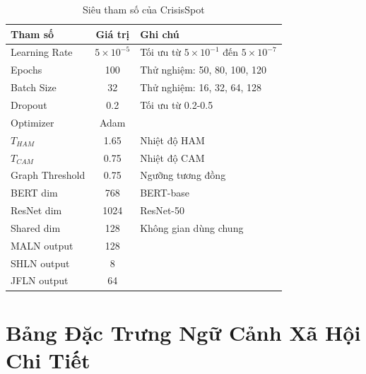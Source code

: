 \documentclass[12pt,a4paper]{article}
\begin{document}
\begin{table}[H]
\centering
\caption{Siêu tham số của CrisisSpot}
\label{tab:hyperparams}
\begin{tabular}{l|c|l}
\toprule
\textbf{Tham số} & \textbf{Giá trị} & \textbf{Ghi chú} \\
\midrule
Learning Rate & $5 \times 10^{-5}$ & Tối ưu từ $5 \times 10^{-1}$ đến $5 \times 10^{-7}$ \\
Epochs & 100 & Thử nghiệm: 50, 80, 100, 120 \\
Batch Size & 32 & Thử nghiệm: 16, 32, 64, 128 \\
Dropout & 0.2 & Tối ưu từ 0.2-0.5 \\
Optimizer & Adam & \\
$T_{HAM}$ & 1.65 & Nhiệt độ HAM \\
$T_{CAM}$ & 0.75 & Nhiệt độ CAM \\
Graph Threshold & 0.75 & Ngưỡng tương đồng \\
BERT dim & 768 & BERT-base \\
ResNet dim & 1024 & ResNet-50 \\
Shared dim & 128 & Không gian dùng chung \\
MALN output & 128 & \\
SHLN output & 8 & \\
JFLN output & 64 & \\
\bottomrule
\end{tabular}
\end{table}

\section{Bảng Đặc Trưng Ngữ Cảnh Xã Hội Chi Tiết}
\end{document}
